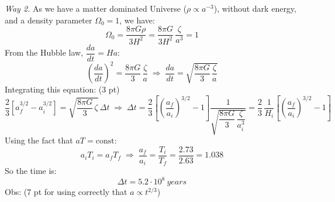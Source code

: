 \medskip
\noindent\textit{Way 2.}
As we have a matter dominated Universe ($\rho \propto a^{-3}$), without dark
energy, and a density parameter $\Omega_0 = 1$, we have:
\begin{equation*}
\Omega_0 = \frac{8\pi G\rho}{3H^2} = \frac{8\pi G}{3H^2}\,\frac{\zeta}{a^3} = 1
\tag*{(4 pt)}
\end{equation*}
From the Hubble law, $\dfrac{da}{dt} = Ha$:
\[
\left(\frac{da}{dt}\right)^{2} = \frac{8\pi G}{3}\,\frac{\zeta}{a}
\;\Rightarrow\;
\frac{da}{dt} = \sqrt{\frac{8\pi G}{3}\,\frac{\zeta}{a}}
\]
Integrating this equation: \hfill(3 pt)
\[
\frac{2}{3}\left[a_f^{3/2} - a_i^{3/2}\right]
= \sqrt{\frac{8\pi G}{3}\,\zeta}\,\Delta t
\;\Rightarrow\;
\Delta t
= \frac{2}{3}\left[\left(\frac{a_f}{a_i}\right)^{3/2} - 1\right]
  \frac{1}{\sqrt{\dfrac{8\pi G}{3}\,\dfrac{\zeta}{a_i^{3}}}}
= \frac{2}{3}\,\frac{1}{H_i}
  \left[\left(\frac{a_f}{a_i}\right)^{3/2} - 1\right]
\]
Using the fact that $aT = \mathrm{const}$:
\[
a_i T_i = a_f T_f
\;\Rightarrow\;
\frac{a_f}{a_i} = \frac{T_i}{T_f} = \frac{2.73}{2.63} = 1.038
\]
So the time is:
\begin{equation*}
\Delta t = 5.2\cdot10^{8}~years \tag*{(1 pt)}
\end{equation*}
Obs: (7 pt for using correctly that $a \propto t^{2/3}$)

